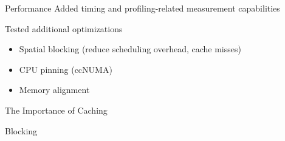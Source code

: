 \documentclass{beamer}
\begin{document}
    \begin{frame}{Performance}
        Added timing and profiling-related measurement capabilities

        \vfill

        Tested additional optimizations
        \begin{itemize}
            \item Spatial blocking (reduce scheduling overhead, cache misses)
            \item CPU pinning (ccNUMA)
            \item Memory alignment
        \end{itemize}
    \end{frame}

    \begin{frame}{The Importance of Caching}
        
    \end{frame}

    \begin{frame}{Blocking}
        
    \end{frame}
\end{document}
